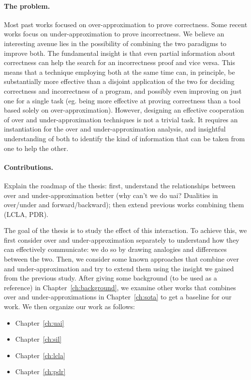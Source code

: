 \paragraph*{The problem.}
Most past works focused on over-approximation to prove correctness. Some recent works focus on under-approximation to prove incorrectness. We believe an interesting avenue lies in the possibility of combining the two paradigms to improve both.
The fundamental insight is that even partial information about correctness can help the search for an incorrectness proof and vice versa. This means that a technique employing both at the same time can, in principle, be substantially more effective than a disjoint application of the two for deciding correctness and incorrectness of a program, and possibly even improving on just one for a single task (eg. being more effective at proving correctness than a tool based solely on over-approximation).
However, designing an effective cooperation of over and under-approximation techniques is not a trivial task. It requires an instantiation for the over and under-approximation analysis, and insightful understanding of both to identify the kind of information that can be taken from one to help the other.

\paragraph*{Contributions.}
\fromhere
Explain the roadmap of the thesis: first, understand the relationships between over and under-approximation better (why can't we do uai? Dualities in over/under and forward/backward); then extend previous works combining them (LCLA, PDR).

The goal of the thesis is to study the effect of this interaction. To achieve this, we first consider over and under-approximation separately to understand how they can effectively communicate: we do so by drawing analogies and differences between the two. Then, we consider some known approaches that combine over and under-approximation and try to extend them using the insight we gained from the previous study.
After giving some background (to be used as a reference) in Chapter~\ref{ch:background}, we examine other works that combines over and under-approximations in Chapter~\ref{ch:sota} to get a baseline for our work. We then organize our work as follows:
\begin{itemize}
	\item Chapter~\ref{ch:uai}
	\item Chapter~\ref{ch:sil}
	\item Chapter~\ref{ch:lcla}
	\item Chapter~\ref{ch:pdr}
\end{itemize}
